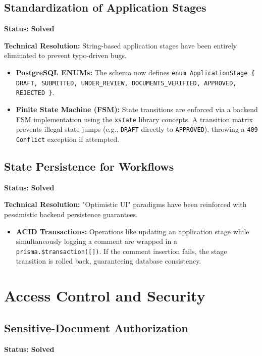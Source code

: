 \documentclass[12pt, a4paper]{article}
\begin{document}
\subsection{Standardization of Application Stages}
\textbf{Status:} \textcolor{solved}{\textbf{Solved}}

\textbf{Technical Resolution:}
String-based application stages have been entirely eliminated to prevent typo-driven bugs.
\begin{itemize}
    \item \textbf{PostgreSQL ENUMs:} The schema now defines \texttt{enum ApplicationStage \{ DRAFT, SUBMITTED, UNDER\_REVIEW, DOCUMENTS\_VERIFIED, APPROVED, REJECTED \}}.
    \item \textbf{Finite State Machine (FSM):} State transitions are enforced via a backend FSM implementation using the \texttt{xstate} library concepts. A transition matrix prevents illegal state jumps (e.g., \texttt{DRAFT} directly to \texttt{APPROVED}), throwing a \texttt{409 Conflict} exception if attempted.
\end{itemize}

\subsection{State Persistence for Workflows}
\textbf{Status:} \textcolor{solved}{\textbf{Solved}}

\textbf{Technical Resolution:}
"Optimistic UI" paradigms have been reinforced with pessimistic backend persistence guarantees.
\begin{itemize}
    \item \textbf{ACID Transactions:} Operations like updating an application stage while simultaneously logging a comment are wrapped in a \texttt{prisma.\$transaction([])}. If the comment insertion fails, the stage transition is rolled back, guaranteeing database consistency.
\end{itemize}

\section{Access Control and Security}

\subsection{Sensitive-Document Authorization}
\textbf{Status:} \textcolor{solved}{\textbf{Solved}}
\end{document}
